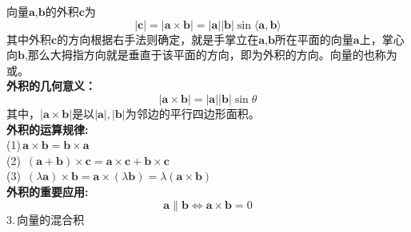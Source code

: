 \vspace*{-1em}\vspace*{-1em}
向量$\boldsymbol{a}$,$\boldsymbol{b}$的外积$\boldsymbol{c}$为
\begin{equation}
	|\boldsymbol{c}|=|\boldsymbol{a}\times\boldsymbol{b}|=|\boldsymbol{a}||\boldsymbol{b}|\sin\langle\boldsymbol{a},\boldsymbol{b}\rangle
\end{equation}
其中外积$\boldsymbol{c}$的方向根据右手法则确定，就是手掌立在$\boldsymbol{a}$,$\boldsymbol{b}$所在平面的向量$\boldsymbol{a}$上，掌心向$\boldsymbol{b}$,那么大拇指方向就是垂直于该平面的方向，即为外积的方向。向量的也称为或。\\
\textbf{外积的几何意义：}
\begin{equation}
	|\boldsymbol{a}\times\boldsymbol{b}|=|\boldsymbol{a}||\boldsymbol{b}|\sin \theta
\end{equation}
其中，$|\boldsymbol{a}\times\boldsymbol{b}|$是以$|\boldsymbol{a}|,|\boldsymbol{b}|$为邻边的平行四边形面积。\\
\textbf{外积的运算规律:}\\
(1)$\,$\qquad $\boldsymbol{a}\times\boldsymbol{b}=\boldsymbol{b}\times\boldsymbol{a}$\\
(2)$\,$\qquad
$(\boldsymbol{a}+\boldsymbol{b})\times\boldsymbol{c}=\boldsymbol{a}\times\boldsymbol{c}+\boldsymbol{b}\times\boldsymbol{c}$\\
(3)$\,$\qquad
$(\lambda\boldsymbol{a})\times\boldsymbol{b}=\boldsymbol{a}\times(\lambda\boldsymbol{b})=\lambda(\boldsymbol{a}\times\boldsymbol{b})$\\
\textbf{外积的重要应用:}
\begin{equation}
	\boldsymbol{a}\parallel\boldsymbol{b}\Leftrightarrow \boldsymbol{a}\times\boldsymbol{b}=0
\end{equation}
3.$\,$向量的混合积\\

